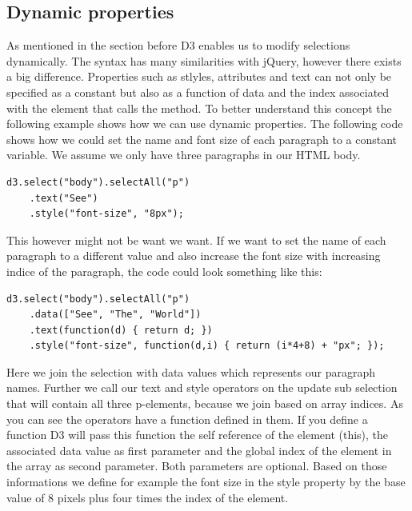 \documentclass{bioinfo}
\begin{document}
\subsection{Dynamic properties}
As mentioned in the section before D3 enables us to modify selections dynamically.
The syntax has many similarities with jQuery, however there exists a big difference.
Properties such as stlyles, attributes and text can not only be specified as a constant but also as a function of data and the index associated with the element that calls the method.
To better understand this concept the following example shows how we can use dynamic properties.
The following code shows how we could set the name and font size of each paragraph to a constant variable.
We assume we only have three paragraphs in our HTML body.
\begin{lstlisting}
d3.select("body").selectAll("p")
    .text("See")
    .style("font-size", "8px");
\end{lstlisting}
This however might not be want we want. 
If we want to set the name of each paragraph to a different value and also increase the font size with increasing indice of the paragraph, the code could look something like this:
\begin{lstlisting}
d3.select("body").selectAll("p")
    .data(["See", "The", "World"])
    .text(function(d) { return d; })
    .style("font-size", function(d,i) { return (i*4+8) + "px"; });
\end{lstlisting}
Here we join the selection with data values which represents our paragraph names. Further we call our text and style operators on the update sub selection that will contain all three p-elements, because we join based on array indices.
As you can see the operators have a function defined in them. If you define a function D3 will pass this function the self reference of the element (this), the associated data value as first parameter and the global index of the element in the array as second parameter. Both parameters are optional. 
Based on those informations we define for example the font size in the style property by the base value of 8 pixels plus four times the index of the element.
\end{document}
